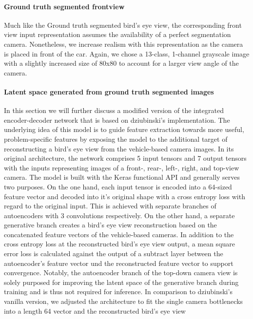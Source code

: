 \documentclass[letterpaper, 10 pt, conference]{ieeeconf}  %
\begin{document}
\paragraph{Ground truth segmented frontview}
Much like the Ground truth segmented bird's eye view, the corresponding front view input representation assumes the availability of a 
perfect segmentation camera. Nonetheless, we increase realism with this representation as the camera is placed in front of the car.
Again, we chose a 13-class, 1-channel grayscale image with a slightly increased size of 80x80 to account for a larger view angle of the 
camera. 
\paragraph{Latent space generated from ground truth segmented images}
In this section we will further discuss a modified version of the integrated encoder-decoder network that is based on 
dziubinski's \cite{dziubinskiSemanticSegmentationSemantic2019} implementation. 
The underlying idea of this model is to 
guide feature extraction towards more useful, problem-specific features by exposing the model to the additional 
target of reconstructing a bird's eye view from the vehicle-based camera images.
In its original architecture, the network comprises 
5 input tensors and 7 output tensors with the inputs representing images of a front-, rear-, left-, right, and top-view camera. The 
model is built with the Keras functional API and generally serves two purposes. On the one hand, each input tensor is encoded into 
a 64-sized feature vector and decoded into it's original shape with a cross entropy loss with regard to the original input. This is 
achieved with separate branches of autoencoders with 3 convolutions respectively. On the other 
hand, a separate generative branch creates a bird's eye view reconstruction based on the concatenated feature vectors of the 
vehicle-based cameras. In addition to the cross entropy loss at the reconstructed bird's eye view output, a mean square error 
loss is calculated against the output of a subtract layer between the autoencoder's feature vector und the reconstructed feature vector to support
convergence. Notably, the autoencoder branch of the top-down camera view is solely purposed for improving the latent space of the generative branch 
during training and is thus not required for inference. 
\newline In comparison to dziubinski's \cite{dziubinskiSemanticSegmentationSemantic2019} vanilla version, we 
adjusted the architecture to fit the single camera bottlenecks into a length 64 vector and the reconstructed bird's eye view
\end{document}
